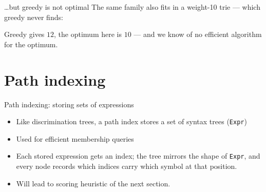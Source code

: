 \documentclass[aspectratio=169]{beamer}
\begin{document}
\begin{frame}{\ldots but greedy is not optimal}
The same family also fits in a \alert{weight-10} trie --- which greedy never finds:
\begin{center}
\end{center}
Greedy gives $12$, the optimum here is $10$ --- and we know of no
efficient algorithm for the optimum.
\end{frame}

\section{Path indexing}

\begin{frame}{Path indexing: storing sets of expressions}
  \begin{itemize}
    \item Like \alert{discrimination trees}, a path index stores a set of
          syntax trees (\texttt{Expr})
    \item Used for efficient membership queries
    \item Each stored expression gets an \alert{index}; the tree mirrors the
          shape of \texttt{Expr}, and every node records \alert{which indices
          carry which symbol} at that position.
    \item Will lead to \alert{scoring heuristic} of the next section.
  \end{itemize}
\end{frame}
\end{document}
